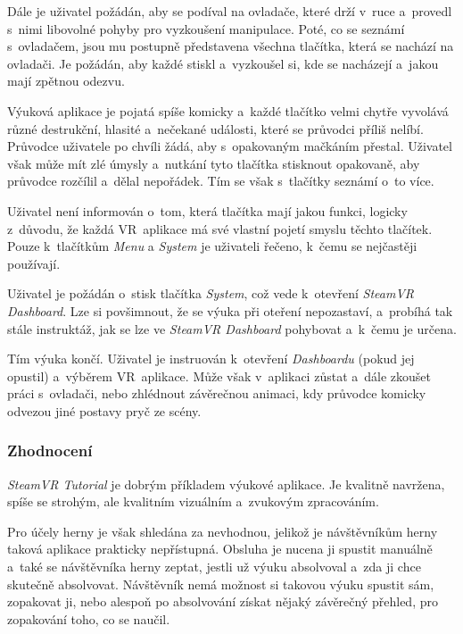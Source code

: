 Dále je uživatel požádán, aby se podíval na ovladače, které drží v~ruce
a~provedl s~nimi libovolné pohyby pro vyzkoušení manipulace.
Poté, co se seznámí s~ovladačem, jsou mu postupně představena
všechna tlačítka, která se nachází na ovladači. Je požádán, aby každé
stiskl a~vyzkoušel si, kde se nacházejí a~jakou mají zpětnou odezvu.

Výuková aplikace je pojatá spíše komicky a~každé tlačítko velmi chytře
vyvolává různé destrukční, hlasité a~nečekané události, které se
průvodci příliš nelíbí. Průvodce uživatele po chvíli žádá, aby s~opakovaným
mačkáním přestal. Uživatel však může mít zlé úmysly a~nutkání tyto tlačítka
stisknout opakovaně, aby průvodce rozčílil a~dělal nepořádek. Tím se
však s~tlačítky seznámí o~to více.

Uživatel není informován o~tom, která tlačítka mají jakou funkci, logicky
z~důvodu, že každá VR~aplikace má své vlastní pojetí smyslu těchto
tlačítek. Pouze k~tlačítkům \emph{Menu} a \emph{System} je uživateli
řečeno, k~čemu se nejčastěji používají.

Uživatel je požádán o~stisk tlačítka \emph{System}, což vede k~otevření
\emph{SteamVR Dashboard}. Lze si povšimnout, že se výuka při oteření
nepozastaví, a~probíhá tak stále instruktáž, jak se lze ve \emph{SteamVR
Dashboard} pohybovat a~k~čemu je určena.

Tím výuka končí. Uživatel je instruován k~otevření
\emph{Dashboardu} (pokud jej opustil) a~výběrem VR~aplikace. Může však
v~aplikaci zůstat a~dále zkoušet práci s~ovladači, nebo zhlédnout
závěrečnou animaci, kdy průvodce komicky odvezou jiné postavy pryč ze
scény.

\subsubsection{Zhodnocení}\label{zhodnocenuxed}

\emph{SteamVR Tutorial} je dobrým příkladem výukové aplikace. Je kvalitně
navržena, spíše se strohým, ale kvalitním vizuálním a~zvukovým
zpracováním.

Pro účely herny je však shledána za nevhodnou, jelikož je návštěvníkům herny
taková aplikace prakticky nepřístupná. Obsluha je nucena ji spustit
manuálně a~také se návštěvníka herny zeptat, jestli už výuku absolvoval
a~zda ji chce skutečně absolvovat. Návštěvník nemá možnost si takovou
výuku spustit sám, zopakovat ji, nebo alespoň po absolvování získat
nějaký závěrečný přehled, pro zopakování toho, co se naučil.

